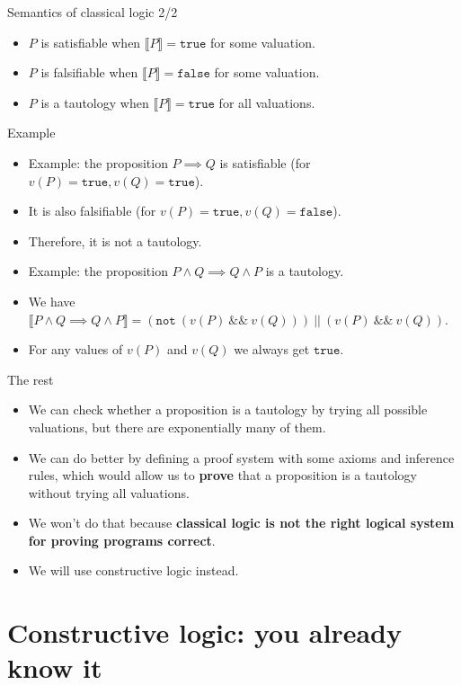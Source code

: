 \documentclass{beamer}
\newcommand{\m}[1]{\texttt{#1}}
\newcommand{\true}{\m{true}}
\newcommand{\false}{\m{false}}
\newcommand{\mnotb}[1]{\m{not}\ #1}
\newcommand{\mandb}[2]{#1\ \m{\&\&}\ #2}
\newcommand{\morb}[2]{#1\ \m{||}\ #2}
\newcommand{\sem}[1]{\llbracket #1 \rrbracket}
\begin{document}
\begin{frame}{Semantics of classical logic 2/2}
\begin{itemize}
	\item $P$ is satisfiable when $\sem{P} = \true$ for some valuation.
	\item $P$ is falsifiable when $\sem{P} = \false$ for some valuation.
	\item $P$ is a tautology when $\sem{P} = \true$ for all valuations.
\end{itemize}
\end{frame}

\begin{frame}{Example}
\begin{itemize}
	\item Example: the proposition $P \implies Q$ is satisfiable (for $v(P) = \true, v(Q) = \true$).
	\item It is also falsifiable (for $v(P) = \true, v(Q) = \false$).
	\item Therefore, it is not a tautology.
	\item Example: the proposition $P \land Q \implies Q \land P$ is a tautology.
	\item We have $\sem{P \land Q \implies Q \land P} = \morb{(\mnotb{(\mandb{v(P)}{v(Q)})})}{(\mandb{v(P)}{v(Q)})}$.
	\item For any values of $v(P)$ and $v(Q)$ we always get $\true$.
\end{itemize}
\end{frame}

\begin{frame}{The rest}
\begin{itemize}
	\item We can check whether a proposition is a tautology by trying all possible valuations, but there are exponentially many of them.
	\item We can do better by defining a proof system with some axioms and inference rules, which would allow us to \textbf{prove} that a proposition is a tautology without trying all valuations.
	\item We won't do that because \textbf{classical logic is not the right logical system for proving programs correct}.
	\item We will use constructive logic instead.
\end{itemize}
\end{frame}

\section{Constructive logic: you already know it}
\end{document}
